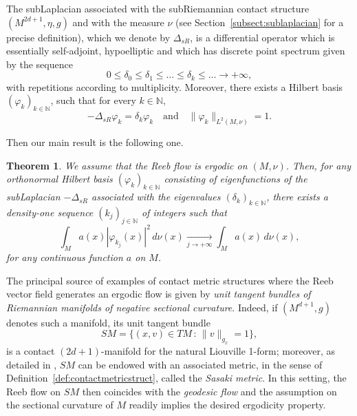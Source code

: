 \documentclass[12pt,a4paper]{amsart}
\theoremstyle{plain}
\newtheorem{theorem}{Theorem}[section]
\theoremstyle{definition}
\theoremstyle{remark}
\numberwithin{equation}{section}
\theoremstyle{definition}
\def\N{{\mathbb N}}%
\def\Tend#1#2{\mathop{\longrightarrow}\limits_{#1\rightarrow#2}}
\numberwithin{equation}{section}
\begin{document}
The subLaplacian associated with the subRiemannian contact structure $(M^{2d+1},\eta,g)$ and with the measure $\nu$ (see Section~\ref{subsect:sublaplacian} for a precise definition), which we denote by $\Delta_{sR}$, is a differential operator which is essentially self-adjoint, hypoelliptic and which has discrete point spectrum given by the sequence 
\begin{equation*}
    0\leq \delta_0\leq \delta_1\leq \dots\leq\delta_k\leq\dots\rightarrow +\infty,
\end{equation*} 
with repetitions according to multiplicity. Moreover, there exists a Hilbert basis $(\varphi_k)_{k\in\N}$, such that for every $k\in \N$,
\begin{equation*}
    -\Delta_{sR}\varphi_k = \delta_k \varphi_k \quad\mbox{and}\quad \|\varphi_k\|_{L^2(M,\nu)} = 1.
\end{equation*}

Then our main result is the following one.

\begin{theorem}
    \label{thm:main}
    We assume that the Reeb flow is ergodic on $(M,\nu)$. Then, for any orthonormal Hilbert basis $(\varphi_k)_{k\in\N}$ consisting of eigenfunctions of the subLaplacian $-\Delta_{sR}$ associated with the eigenvalues $(\delta_k)_{k\in\N}$, there exists a density-one sequence $(k_j)_{j\in\N}$ of integers such that
    \begin{equation*}
        \int_{M}a(x)|\varphi_{k_j}(x)|^2\,d\nu(x) \Tend{j}{+\infty} \int_{M}a(x)\,d\nu(x),
    \end{equation*}
    for any continuous function $a$ on $M$.
\end{theorem}

The principal source of examples of contact metric structures where the Reeb vector field generates an ergodic flow is given by \emph{unit tangent bundles of Riemannian manifolds of negative sectional curvature}. Indeed, if $(M^{d+1},g)$ denotes such a manifold, its unit tangent bundle
\begin{equation*}
    SM = \{(x,v)\in TM\,:\,\|v\|_{g_x}=1\},
\end{equation*}
is a contact $(2d+1)$-manifold for the natural Liouville 1-form; moreover, as detailed in \cite[Section 9.2]{Blair}, $SM$ can be endowed with an associated metric, in the sense of Definition~\ref{def:contactmetricstruct}, called the \emph{Sasaki metric}. In this setting, the Reeb flow on $SM$ then coincides with the \emph{geodesic flow} and the assumption on the sectional curvature of $M$ readily implies the desired ergodicity property.
\end{document}
